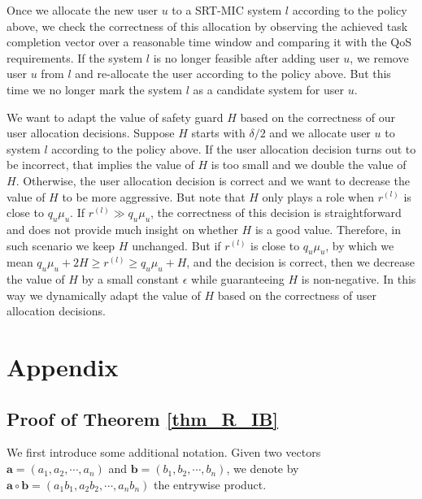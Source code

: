 \documentclass[prodmode,acmtompecs]{acmsmall}
\newcommand{\reqscalar}{q}
\newcommand{\myComments}[1]{}
\newcommand{\commentEnd}{\myComments{End}}
\begin{document}
Once we allocate the new user $u$ to a SRT-MIC system $l$ according to the policy above, we check the correctness of this allocation by observing the achieved task completion vector over a reasonable time window and comparing it with the QoS requirements. If the system $l$ is no longer feasible after adding user $u$, we remove user $u$ from $l$ and re-allocate the user according to the policy above. But this time we no longer mark the system $l$ as a candidate system for user $u$. 

We want to adapt the value of safety guard $H$ based on the correctness of our user allocation decisions. Suppose $H$ starts with $\delta/2$ and we allocate user $u$ to system $l$ according to the policy above. If the user allocation decision turns out to be incorrect, that implies the value of $H$ is too small and we double the value of $H$. Otherwise, the user allocation decision is correct and we want to decrease the value of $H$ to be more aggressive. But note that $H$ only plays a role when $r^{(l)}$ is close to $\reqscalar_u\mu_u$. If $r^{(l)} \gg \reqscalar_u\mu_u$, the correctness of this decision is straightforward and does not provide much insight on whether $H$ is a good value. Therefore, in such scenario we keep $H$ unchanged. But if $r^{(l)}$ is close to $\reqscalar_u\mu_u$, by which we mean $\reqscalar_u\mu_u + 2H \geq r^{(l)} \geq \reqscalar_u\mu_u + H$, and the decision is correct, then we decrease the value of $H$ by a small constant $\epsilon$ while guaranteeing $H$ is non-negative. In this way we dynamically adapt the value of $H$ based on the correctness of user allocation decisions. 

\commentEnd\fi











\section{Appendix}

\subsection{Proof of Theorem \ref{thm_R_IB}}
\label{pf_theorem_R_IB}
We first introduce some additional notation. Given two vectors $\boldsymbol{a}=(a_1, a_2, \cdots, a_n)$ and $\mathbf{b} = (b_1, b_2, \cdots, b_n)$, we denote by $\boldsymbol{a} \circ \mathbf{b}=(a_1 b_1, a_2 b_2, \cdots, a_n b_n)$ the entrywise product. 
\end{document}
